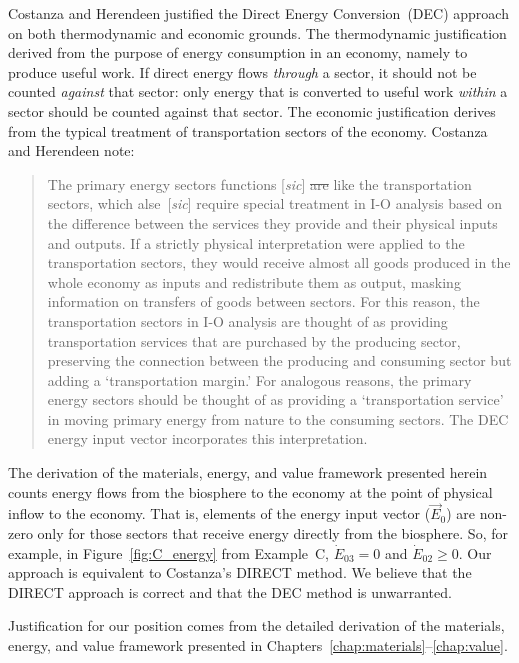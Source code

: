 Costanza and Herendeen justified the Direct Energy Conversion~(DEC) 
approach on both thermodynamic and economic grounds. 
The thermodynamic justification derived from the purpose 
of energy consumption in an economy, 
namely to produce useful work. 
If direct energy flows \emph{through} a sector, 
it should not be counted \emph{against} that sector: 
only energy that is converted to useful work \emph{within} 
a sector should be counted against that sector.
The economic justification derives 
from the typical treatment of transportation sectors of the economy.
Costanza and Herendeen note:

\begin{quote}
	The primary energy sectors functions [\emph{sic}] \sout{are}
	like the transportation sectors, 
	which alse~[\emph{sic}] require special treatment in I-O analysis 
	based on the difference between the services they provide 
	and their physical inputs and outputs. 
	If a strictly physical interpretation were applied to the 
	transportation sectors, 
	they would receive almost all goods produced in the whole economy as inputs 
	and redistribute them as output, 
	masking information on transfers of goods between sectors. 
	For this reason, the transportation sectors in I-O analysis 
	are thought of as providing transportation services 
	that are purchased by the producing sector, 
	preserving the connection between the producing and consuming sector 
	but adding a `transportation margin.' 
	For analogous reasons, 
	the primary energy sectors should be thought of as providing a 
	`transportation service' in moving primary energy 
	from nature to the consuming sectors. 
	The DEC energy input vector incorporates this interpretation.\cite[p. 151]{Costanza:1984tq}
\end{quote}

The derivation of the materials, energy, and value framework
presented herein counts energy flows from the biosphere to the economy
at the point of physical inflow to the economy. 
That is, elements of the energy input vector 
($\vec{E}_{0}$) are non-zero only for those sectors 
that receive energy directly from the biosphere. 
So, for example, in Figure~\ref{fig:C_energy} from Example~C, 
$\dot{E}_{03} = 0$ and $\dot{E}_{02} \ge 0$. 
Our approach is equivalent to Costanza's DIRECT method.
We believe that the DIRECT approach is correct and that the DEC method is unwarranted.

Justification for our position comes from the detailed derivation
of the materials, energy, and value framework presented in 
Chapters~\ref{chap:materials}--\ref{chap:value}. 

